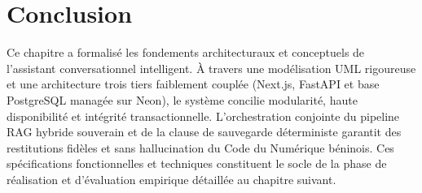 \clearpage
\section*{Conclusion}

Ce chapitre a formalisé les fondements architecturaux et conceptuels de l'assistant conversationnel intelligent. À travers une modélisation UML rigoureuse et une architecture trois tiers faiblement couplée (Next.js, FastAPI et base PostgreSQL managée sur Neon), le système concilie modularité, haute disponibilité et intégrité transactionnelle. L'orchestration conjointe du pipeline RAG hybride souverain et de la clause de sauvegarde déterministe garantit des restitutions fidèles et sans hallucination du Code du Numérique béninois. Ces spécifications fonctionnelles et techniques constituent le socle de la phase de réalisation et d'évaluation empirique détaillée au chapitre suivant.
